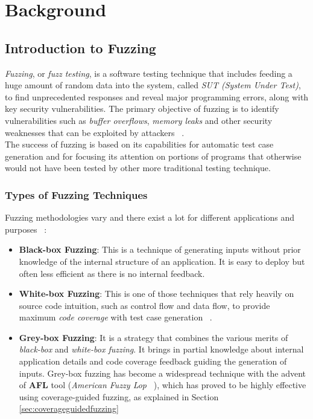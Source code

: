 \chapter{Background}
\label{chap:background}

\section{Introduction to Fuzzing}

\textit{Fuzzing}, or \textit{fuzz testing}, is a software testing technique that includes feeding a huge amount of random data into the system, called \textit{SUT (System Under Test)}, to find unprecedented responses and reveal major programming errors, along with key security vulnerabilities. The primary objective of fuzzing is to identify vulnerabilities such as \textit{buffer overflows}, \textit{memory leaks} and other security weaknesses that can be exploited by attackers ~\cite{fuzzingprogresschallenges}.
\\The success of fuzzing is based on its capabilities for automatic test case generation and for focusing its attention on portions of programs that otherwise would not have been tested by other more traditional testing technique.

\subsection{Types of Fuzzing Techniques}
Fuzzing methodologies vary and there exist a lot for different applications and purposes ~\cite{statefulfuzzingcristian}:

\begin{itemize}
    \item \textbf{Black-box Fuzzing}: This is a technique of generating inputs without prior knowledge of the internal structure of an application. It is easy to deploy but often less efficient as there is no internal feedback.
    
    \item \textbf{White-box Fuzzing}: This is one of those techniques that rely heavily on source code intuition, such as control flow and data flow, to provide maximum \textit{code coverage} with test case generation ~\cite{grammarfuzzingwhitebox}.
    
    \item \textbf{Grey-box Fuzzing}: It is a strategy that combines the various merits of \textit{black-box} and \textit{white-box fuzzing}. It brings in partial knowledge about internal application details and code coverage feedback guiding the generation of inputs. Grey-box fuzzing has become a widespread technique with the advent of \textbf{AFL} tool (\textit{American Fuzzy Lop} ~\cite{afl}), which has proved to be highly effective using coverage-guided fuzzing, as explained in Section \ref{sec:coverageguidedfuzzing}
\end{itemize}

